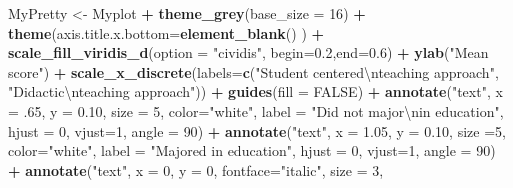 \documentclass[
]{article}
\newenvironment{Shaded}{\begin{snugshade}}{\end{snugshade}}
\newcommand{\CharTok}[1]{\textcolor[rgb]{0.31,0.60,0.02}{#1}}
\newcommand{\DataTypeTok}[1]{\textcolor[rgb]{0.13,0.29,0.53}{#1}}
\newcommand{\DecValTok}[1]{\textcolor[rgb]{0.00,0.00,0.81}{#1}}
\newcommand{\FloatTok}[1]{\textcolor[rgb]{0.00,0.00,0.81}{#1}}
\newcommand{\KeywordTok}[1]{\textcolor[rgb]{0.13,0.29,0.53}{\textbf{#1}}}
\newcommand{\NormalTok}[1]{#1}
\newcommand{\OperatorTok}[1]{\textcolor[rgb]{0.81,0.36,0.00}{\textbf{#1}}}
\newcommand{\OtherTok}[1]{\textcolor[rgb]{0.56,0.35,0.01}{#1}}
\newcommand{\StringTok}[1]{\textcolor[rgb]{0.31,0.60,0.02}{#1}}
\begin{document}
\begin{Shaded}
\begin{Highlighting}[]
\NormalTok{MyPretty <-}\StringTok{ }\NormalTok{Myplot }\OperatorTok{+}
\StringTok{  }\KeywordTok{theme_grey}\NormalTok{(}\DataTypeTok{base_size =} \DecValTok{16}\NormalTok{) }\OperatorTok{+}
\StringTok{  }\KeywordTok{theme}\NormalTok{(}\DataTypeTok{axis.title.x.bottom=}\KeywordTok{element_blank}\NormalTok{() ) }\OperatorTok{+}
\StringTok{  }\KeywordTok{scale_fill_viridis_d}\NormalTok{(}\DataTypeTok{option =} \StringTok{"cividis"}\NormalTok{, }\DataTypeTok{begin=}\FloatTok{0.2}\NormalTok{,}\DataTypeTok{end=}\FloatTok{0.6}\NormalTok{) }\OperatorTok{+}
\StringTok{  }\KeywordTok{ylab}\NormalTok{(}\StringTok{"Mean score"}\NormalTok{)   }\OperatorTok{+}
\StringTok{  }\KeywordTok{scale_x_discrete}\NormalTok{(}\DataTypeTok{labels=}\KeywordTok{c}\NormalTok{(}\StringTok{"Student centered}\CharTok{\textbackslash{}n}\StringTok{teaching approach"}\NormalTok{,}
                            \StringTok{"Didactic}\CharTok{\textbackslash{}n}\StringTok{teaching approach"}\NormalTok{)) }\OperatorTok{+}
\StringTok{  }\KeywordTok{guides}\NormalTok{(}\DataTypeTok{fill =} \OtherTok{FALSE}\NormalTok{) }\OperatorTok{+}
\StringTok{  }\KeywordTok{annotate}\NormalTok{(}\StringTok{"text"}\NormalTok{, }\DataTypeTok{x =} \FloatTok{.65}\NormalTok{, }\DataTypeTok{y =} \FloatTok{0.10}\NormalTok{, }\DataTypeTok{size =} \DecValTok{5}\NormalTok{, }\DataTypeTok{color=}\StringTok{"white"}\NormalTok{, }
            \DataTypeTok{label =} \StringTok{"Did not major}\CharTok{\textbackslash{}n}\StringTok{in education"}\NormalTok{,}
            \DataTypeTok{hjust =} \DecValTok{0}\NormalTok{, }\DataTypeTok{vjust=}\DecValTok{1}\NormalTok{,  }\DataTypeTok{angle =} \DecValTok{90}\NormalTok{) }\OperatorTok{+}\StringTok{ }
\StringTok{  }\KeywordTok{annotate}\NormalTok{(}\StringTok{"text"}\NormalTok{, }\DataTypeTok{x =} \FloatTok{1.05}\NormalTok{, }\DataTypeTok{y =} \FloatTok{0.10}\NormalTok{, }\DataTypeTok{size =}\DecValTok{5}\NormalTok{,  }\DataTypeTok{color=}\StringTok{"white"}\NormalTok{,}
            \DataTypeTok{label =} \StringTok{"Majored in education"}\NormalTok{,}
            \DataTypeTok{hjust =} \DecValTok{0}\NormalTok{, }\DataTypeTok{vjust=}\DecValTok{1}\NormalTok{, }\DataTypeTok{angle =} \DecValTok{90}\NormalTok{) }\OperatorTok{+}
\StringTok{   }
\StringTok{  }\KeywordTok{annotate}\NormalTok{(}\StringTok{"text"}\NormalTok{, }\DataTypeTok{x =} \DecValTok{0}\NormalTok{, }\DataTypeTok{y =} \DecValTok{0}\NormalTok{, }\DataTypeTok{fontface=}\StringTok{"italic"}\NormalTok{, }\DataTypeTok{size =} \DecValTok{3}\NormalTok{,}

\end{Highlighting}
\end{Shaded}
\end{document}

